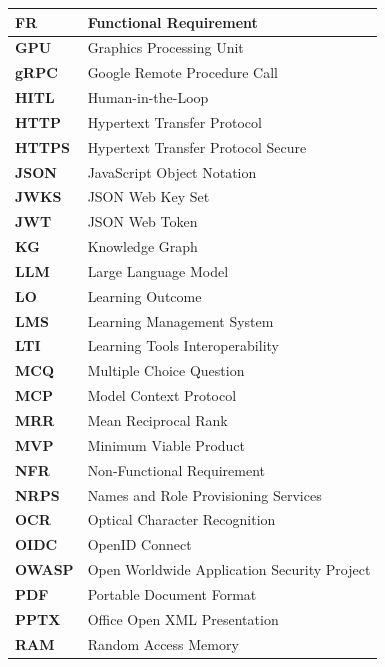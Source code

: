 \begin{longtable}{|p{3.5cm}|p{11cm}|}
    \textbf{FR}      & Functional Requirement \\
    \hline
    \textbf{GPU}     & Graphics Processing Unit \\
    \hline
    \textbf{gRPC}    & Google Remote Procedure Call \\
    \hline
    \textbf{HITL}    & Human-in-the-Loop \\
    \hline
    \textbf{HTTP}    & Hypertext Transfer Protocol \\
    \hline
    \textbf{HTTPS}   & Hypertext Transfer Protocol Secure \\
    \hline
    \textbf{JSON}    & JavaScript Object Notation \\
    \hline
    \textbf{JWKS}    & JSON Web Key Set \\
    \hline
    \textbf{JWT}     & JSON Web Token \\
    \hline
    \textbf{KG}      & Knowledge Graph \\
    \hline
    \textbf{LLM}     & Large Language Model \\
    \hline
    \textbf{LO}      & Learning Outcome \\
    \hline
    \textbf{LMS}     & Learning Management System \\
    \hline
    \textbf{LTI}     & Learning Tools Interoperability \\
    \hline
    \textbf{MCQ}     & Multiple Choice Question \\
    \hline
    \textbf{MCP}     & Model Context Protocol \\
    \hline
    \textbf{MRR}     & Mean Reciprocal Rank \\
    \hline
    \textbf{MVP}     & Minimum Viable Product \\
    \hline
    \textbf{NFR}     & Non-Functional Requirement \\
    \hline
    \textbf{NRPS}    & Names and Role Provisioning Services \\
    \hline
    \textbf{OCR}     & Optical Character Recognition \\
    \hline
    \textbf{OIDC}    & OpenID Connect \\
    \hline
    \textbf{OWASP}   & Open Worldwide Application Security Project \\
    \hline
    \textbf{PDF}     & Portable Document Format \\
    \hline
    \textbf{PPTX}    & Office Open XML Presentation \\
    \hline
    \textbf{RAM}     & Random Access Memory \\

\end{longtable}
